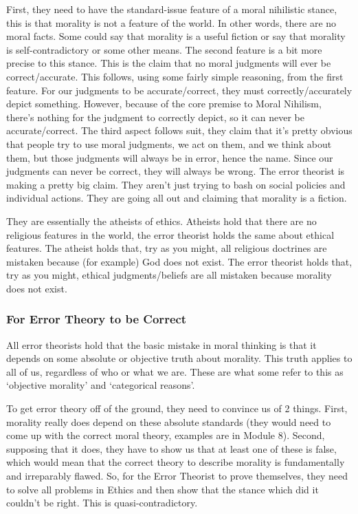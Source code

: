 First, they need to have the standard-issue feature of a moral nihilistic stance, this is that morality is not a feature of the world. In other words, there are no moral facts. Some could say that morality is a useful fiction or say that morality is self-contradictory or some other means. The second feature is a bit more precise to this stance. This is the claim that no moral judgments will ever be correct/accurate.  This follows, using some fairly simple reasoning, from the first feature. For our judgments to be accurate/correct, they must correctly/accurately depict something. However, because of the core premise to Moral Nihilism, there's nothing for the judgment to correctly depict, so it can never be accurate/correct. The third aspect follows suit, they claim that it's pretty obvious that people try to use moral judgments, we act on them, and we think about them, but those judgments will always be in error, hence the name. Since our judgments can never be correct, they will always be wrong. The error theorist is making a pretty big claim. They aren’t just trying to bash on social policies and individual actions. They are going all out and claiming that morality is a fiction.

They are essentially the atheists of ethics. Atheists hold that there are no religious features in the world, the error theorist holds the same about ethical features. The atheist holds that, try as you might, all religious doctrines are mistaken because (for example) God does not exist. The error theorist holds that, try as you might, ethical judgments/beliefs are all mistaken because morality does not exist.

\subsubsection{For Error Theory to be Correct}

All error theorists hold that the basic mistake in moral thinking is that it depends on some absolute or objective truth about morality. This truth applies to all of us, regardless of who or what we are. These are what some refer to this as ‘objective morality’ and ‘categorical reasons’.

To get error theory off of the ground, they need to convince us of 2 things. First, morality really does depend on these absolute standards (they would need to come up with the correct moral theory, examples are in Module 8). Second, supposing that it does, they have to show us that at least one of these is false, which would mean that the correct theory to describe morality is fundamentally and irreparably flawed. So, for the Error Theorist to prove themselves, they need to solve all problems in Ethics and then show that the stance which did it couldn't be right. This is quasi-contradictory.

